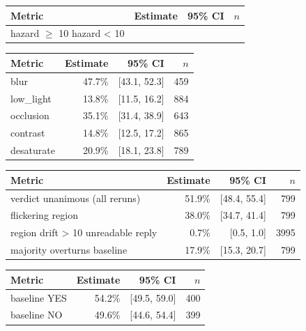 \begin{tabular}{lrrr}
\toprule
Metric & Estimate & 95\% CI & $n$ \\
\midrule
hazard $\geq$ 10%
hazard < 10%
\bottomrule
\end{tabular}

\begin{tabular}{lrrr}
\toprule
Metric & Estimate & 95\% CI & $n$ \\
\midrule
blur & 47.7\% & [43.1, 52.3] & 459 \\
low\_light & 13.8\% & [11.5, 16.2] & 884 \\
occlusion & 35.1\% & [31.4, 38.9] & 643 \\
contrast & 14.8\% & [12.5, 17.2] & 865 \\
desaturate & 20.9\% & [18.1, 23.8] & 789 \\
\bottomrule
\end{tabular}

\begin{tabular}{lrrr}
\toprule
Metric & Estimate & 95\% CI & $n$ \\
\midrule
verdict unanimous (all reruns) & 51.9\% & [48.4, 55.4] & 799 \\
flickering region & 38.0\% & [34.7, 41.4] & 799 \\
region drift > 10%
unreadable reply & 0.7\% & [0.5, 1.0] & 3995 \\
majority overturns baseline & 17.9\% & [15.3, 20.7] & 799 \\
\bottomrule
\end{tabular}

\begin{tabular}{lrrr}
\toprule
Metric & Estimate & 95\% CI & $n$ \\
\midrule
baseline YES & 54.2\% & [49.5, 59.0] & 400 \\
baseline NO & 49.6\% & [44.6, 54.4] & 399 \\
\bottomrule
\end{tabular}

